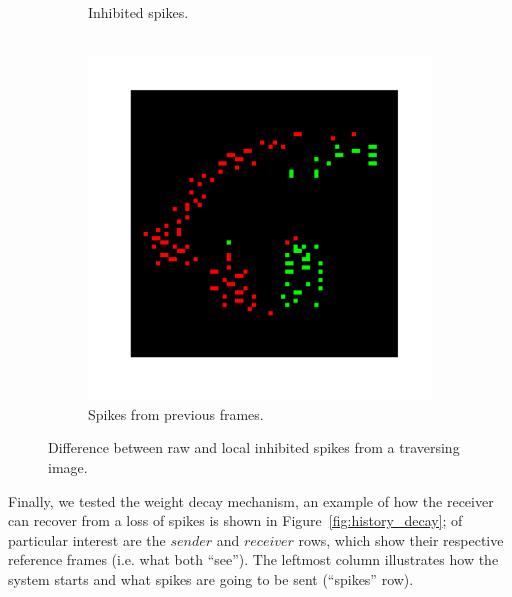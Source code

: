 \documentclass[conference]{IEEEtran}
\begin{document}
\begin{figure}[htb]
\begin{subfigure}[b]{0.155\textwidth}
    \caption{Inhibited spikes.\\~}
    \label{fig:post_inh}
  \end{subfigure}
  \begin{subfigure}[b]{0.155\textwidth}
    \includegraphics[width=\textwidth,trim={3cm 2cm 2cm 2cm},clip] {inhibitory_behaviour__DIFF___cycle_00000___frame_00035_}
    \caption{Spikes from previous frames.}
    \label{fig:diff_post_inh}
  \end{subfigure}
  \caption[Difference between raw and local inhibited spikes from a traversing image.]{Difference between raw and local inhibited spikes from a traversing image.}
  \label{fig:inh_diff}
\end{figure}

Finally, we tested the weight decay mechanism, an example of how the receiver can recover from a loss of spikes is shown in Figure~\ref{fig:history_decay}; of particular interest are the $sender$ and $receiver$ rows, which show their respective reference frames (i.e. what both ``see''). The leftmost column illustrates how the system starts and what spikes are going to be sent (``spikes'' row).
\end{document}
